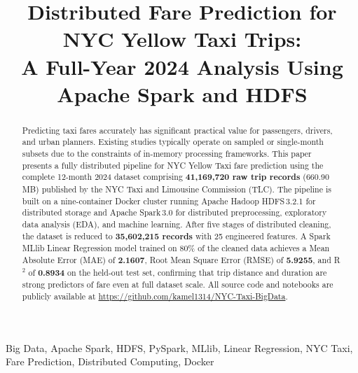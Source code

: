 \documentclass[conference]{IEEEtran}
\begin{document}
\title{Distributed Fare Prediction for NYC Yellow Taxi Trips:\\
A Full-Year 2024 Analysis Using Apache Spark and HDFS}

\author{
}

\maketitle

\begin{abstract}
Predicting taxi fares accurately has significant practical value
for passengers, drivers, and urban planners. Existing studies
typically operate on sampled or single-month subsets due to the
constraints of in-memory processing frameworks. This paper presents
a fully distributed pipeline for NYC Yellow Taxi fare prediction
using the complete 12-month 2024 dataset comprising
\textbf{41,169,720 raw trip records} (660.90\,MB) published by the
NYC Taxi and Limousine Commission (TLC). The pipeline is built on a
nine-container Docker cluster running Apache Hadoop HDFS\,3.2.1 for
distributed storage and Apache Spark\,3.0 for distributed
preprocessing, exploratory data analysis (EDA), and machine
learning. After five stages of distributed cleaning, the dataset is
reduced to \textbf{35,602,215 records} with 25 engineered features.
A Spark MLlib Linear Regression model trained on 80\% of the
cleaned data achieves a Mean Absolute Error (MAE) of
\textbf{2.1607}, Root Mean Square Error (RMSE) of \textbf{5.9255},
and R$^{2}$ of \textbf{0.8934} on the held-out test set, confirming
that trip distance and duration are strong predictors of fare even
at full dataset scale. All source code and notebooks are publicly
available at \url{https://github.com/kamel1314/NYC-Taxi-BigData}.
\end{abstract}

\begin{IEEEkeywords}
Big Data, Apache Spark, HDFS, PySpark, MLlib, Linear Regression,
NYC Taxi, Fare Prediction, Distributed Computing, Docker
\end{IEEEkeywords}
\end{document}
